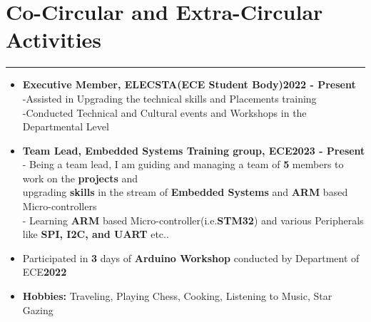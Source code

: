 \documentclass[10pt]{article}
\begin{document}
\section*{Co-Circular and Extra-Circular Activities}
\hrule
\vspace{0.5cm}
\begin{itemize}[leftmargin=*]

\item \textbf{Executive Member, ELECSTA(ECE Student Body)}\hspace{7.2cm}\textbf{2022 - Present}\\
-Assisted in Upgrading the technical skills and Placements training\\
-Conducted Technical and Cultural events and Workshops in the Departmental Level

\item \textbf{Team Lead, Embedded Systems Training group, ECE}\hspace{6.6cm}\textbf{2023 - Present}\\
- Being a team lead, I am guiding and managing a team of \textbf{5} members to work on the \textbf{projects} and \\
\hspace*{0.15cm} upgrading \textbf{skills} in the stream of \textbf{Embedded Systems} and \textbf{ARM} based Micro-controllers \\
- Learning \textbf{ARM} based Micro-controller(i.e.\textbf{STM32}) and various Peripherals like \textbf{SPI, I2C, and UART} etc.. 

\item Participated in \textbf{3} days of \textbf{Arduino Workshop} conducted by Department of ECE\hspace{5.6cm}\textbf{2022}

\item \textbf{Hobbies:} Traveling, Playing Chess, Cooking, Listening to Music, Star Gazing 


\end{itemize}
\end{document}
